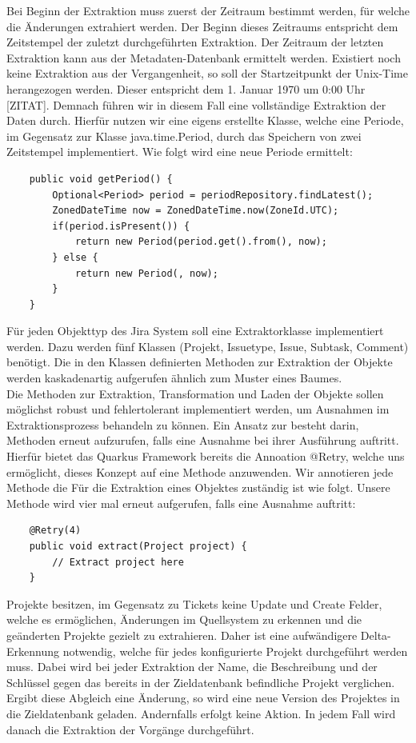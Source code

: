 \documentclass[10pt]{article}
\begin{document}
Bei Beginn der Extraktion muss zuerst der Zeitraum bestimmt werden, für welche die Änderungen extrahiert werden. Der Beginn dieses Zeitraums entspricht dem Zeitstempel der zuletzt durchgeführten Extraktion. Der Zeitraum der letzten Extraktion kann aus der Metadaten-Datenbank ermittelt werden. Existiert noch keine Extraktion aus der Vergangenheit, so soll der Startzeitpunkt der Unix-Time herangezogen werden. Dieser entspricht dem 1. Januar 1970 um 0:00 Uhr [ZITAT]. Demnach führen wir in diesem Fall eine vollständige Extraktion der Daten durch. Hierfür nutzen wir eine eigens erstellte Klasse, welche eine Periode, im Gegensatz zur Klasse java.time.Period, durch das Speichern von zwei Zeitstempel implementiert. Wie folgt wird eine neue Periode ermittelt:
\begin{verbatim}
    public void getPeriod() {
        Optional<Period> period = periodRepository.findLatest();
        ZonedDateTime now = ZonedDateTime.now(ZoneId.UTC);
        if(period.isPresent()) {
            return new Period(period.get().from(), now);
        } else {
            return new Period(, now);
        }
    }
\end{verbatim}
Für jeden Objekttyp des Jira System soll eine Extraktorklasse implementiert werden. Dazu werden fünf Klassen (Projekt, Issuetype, Issue, Subtask, Comment) benötigt. Die in den Klassen definierten Methoden zur Extraktion der Objekte werden kaskadenartig aufgerufen ähnlich zum Muster eines Baumes.\\
Die Methoden zur Extraktion, Transformation und Laden der Objekte sollen möglichst robust und fehlertolerant implementiert werden, um Ausnahmen im Extraktionsprozess behandeln zu können. Ein Ansatz zur besteht darin, Methoden erneut aufzurufen, falls eine Ausnahme bei ihrer Ausführung auftritt. Hierfür bietet das Quarkus Framework bereits die Annoation \glqq @Retry\grqq\:, welche uns ermöglicht, dieses Konzept auf eine Methode anzuwenden. Wir annotieren jede Methode die Für die Extraktion eines Objektes zuständig ist wie folgt. Unsere Methode wird vier mal erneut aufgerufen, falls eine Ausnahme auftritt:
\begin{verbatim}
    @Retry(4)
    public void extract(Project project) {
        // Extract project here
    }
\end{verbatim}
Projekte besitzen, im Gegensatz zu Tickets keine Update und Create Felder, welche es ermöglichen, Änderungen im Quellsystem zu erkennen und die geänderten Projekte gezielt zu extrahieren. Daher ist eine aufwändigere Delta-Erkennung notwendig, welche für jedes konfigurierte Projekt durchgeführt werden muss. Dabei wird bei jeder Extraktion der Name, die Beschreibung und der Schlüssel gegen das bereits in der Zieldatenbank befindliche Projekt verglichen. Ergibt diese Abgleich eine Änderung, so wird eine neue Version des Projektes in die Zieldatenbank geladen. Andernfalls erfolgt keine Aktion. In jedem Fall wird danach die Extraktion der Vorgänge durchgeführt.
\end{document}
